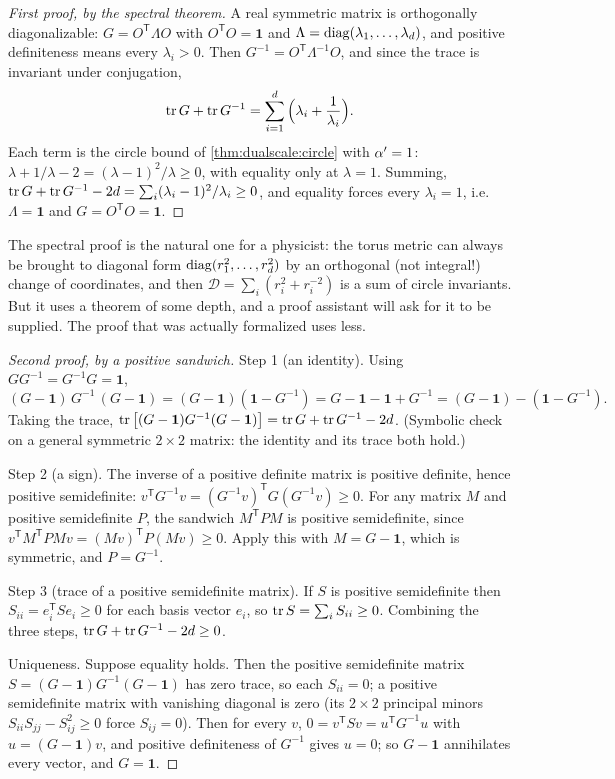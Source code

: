 \begin{proof}[First proof, by the spectral theorem]
A real symmetric matrix is orthogonally diagonalizable: $G=O^{\mathsf T}\Lambda O$ with
$O^{\mathsf T}O=\mathbf1$ and $\Lambda=\operatorname{diag}(\lambda_1,\dots,\lambda_d)$, and positive
definiteness means every $\lambda_i>0$. Then $G^{-1}=O^{\mathsf T}\Lambda^{-1}O$, and since the
trace is invariant under conjugation,
\[
 \operatorname{tr} G+\operatorname{tr} G^{-1}=\sum_{i=1}^d\Big(\lambda_i+\frac1{\lambda_i}\Big).
\]
Each term is the circle bound of \cref{thm:dualscale:circle} with $\alpha'=1$:
$\lambda+1/\lambda-2=(\lambda-1)^2/\lambda\ge0$, with equality only at $\lambda=1$. Summing,
$\operatorname{tr} G+\operatorname{tr} G^{-1}-2d=\sum_i(\lambda_i-1)^2/\lambda_i\ge0$, and equality forces every
$\lambda_i=1$, i.e. $\Lambda=\mathbf1$ and $G=O^{\mathsf T}O=\mathbf1$.
\end{proof}

The spectral proof is the natural one for a physicist: the torus metric can always be brought
to diagonal form $\operatorname{diag}(r_1^2,\dots,r_d^2)$ by an orthogonal (not integral!) change of
coordinates, and then $\mathcal D=\sum_i(r_i^2+r_i^{-2})$ is a sum of circle invariants. But it
uses a theorem of some depth, and a proof assistant will ask for it to be supplied. The proof
that was actually formalized uses less.

\begin{proof}[Second proof, by a positive sandwich]
Step 1 (an identity). Using $GG^{-1}=G^{-1}G=\mathbf1$,
\begin{equation}\label{eq:dualscale:sandwich}
 (G-\mathbf1)\,G^{-1}\,(G-\mathbf1)
 =(G-\mathbf1)(\mathbf1-G^{-1})
 =G-\mathbf1-\mathbf1+G^{-1}
 =(G-\mathbf1)-(\mathbf1-G^{-1}).
\end{equation}
Taking the trace, $\operatorname{tr}\big[(G-\mathbf1)G^{-1}(G-\mathbf1)\big]=\operatorname{tr} G+\operatorname{tr} G^{-1}-2d$. (Symbolic
check on a general symmetric $2\times2$ matrix: the identity and its trace both hold.)

Step 2 (a sign). The inverse of a positive definite matrix is positive definite, hence positive
semidefinite: $v^{\mathsf T}G^{-1}v=(G^{-1}v)^{\mathsf T}G(G^{-1}v)\ge0$. For any matrix $M$
and positive semidefinite $P$, the sandwich $M^{\mathsf T}PM$ is positive semidefinite, since
$v^{\mathsf T}M^{\mathsf T}PMv=(Mv)^{\mathsf T}P(Mv)\ge0$. Apply this with $M=G-\mathbf1$,
which is symmetric, and $P=G^{-1}$.

Step 3 (trace of a positive semidefinite matrix). If $S$ is positive semidefinite then
$S_{ii}=e_i^{\mathsf T}Se_i\ge0$ for each basis vector $e_i$, so $\operatorname{tr} S=\sum_iS_{ii}\ge0$.
Combining the three steps, $\operatorname{tr} G+\operatorname{tr} G^{-1}-2d\ge0$.

Uniqueness. Suppose equality holds. Then the positive semidefinite matrix
$S=(G-\mathbf1)G^{-1}(G-\mathbf1)$ has zero trace, so each $S_{ii}=0$; a positive
semidefinite matrix with vanishing diagonal is zero (its $2\times2$ principal minors
$S_{ii}S_{jj}-S_{ij}^2\ge0$ force $S_{ij}=0$). Then for every $v$,
$0=v^{\mathsf T}Sv=u^{\mathsf T}G^{-1}u$ with $u=(G-\mathbf1)v$, and positive definiteness of
$G^{-1}$ gives $u=0$; so $G-\mathbf1$ annihilates every vector, and $G=\mathbf1$.
\end{proof}

